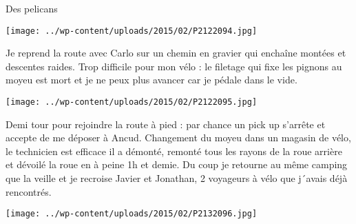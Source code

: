  Des pelicans \newline
\centerline{\texttt{[image: ../wp-content/uploads/2015/02/P2122094.jpg]} } 
 Je reprend la route avec Carlo sur un chemin en gravier qui enchaîne montées et descentes raides. \newline
 Trop difficile pour mon vélo : le filetage qui fixe les pignons au moyeu est mort et je ne peux plus avancer car je pédale dans le vide. \newline
 \newline
\centerline{\texttt{[image: ../wp-content/uploads/2015/02/P2122095.jpg]} } 
 Demi tour pour rejoindre la route à pied : par chance un pick up s'arrête et accepte de me déposer à Ancud. \newline
 Changement du moyeu dans un magasin de vélo, le technicien est efficace il a démonté, remonté tous les rayons de la roue arrière et dévoilé la roue en à peine 1h et demie. \newline
 Du coup je retourne au même camping que la veille et je recroise Javier et Jonathan, 2 voyageurs à vélo que j´avais déjà rencontrés. \newline
 \newline
\centerline{\texttt{[image: ../wp-content/uploads/2015/02/P2132096.jpg]} } 
 \newline

\newpage
 
